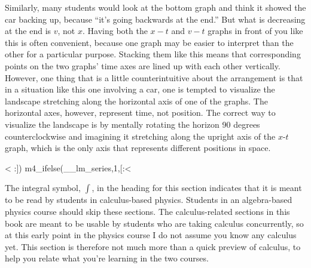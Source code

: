 Similarly, many students would look at the bottom graph and
think it showed the car backing up, because ``it's going
backwards at the end.''  But what is decreasing at the end
is $v$, not $x$. Having both the $x-t$ and $v-t$ graphs in
front of you like this is often convenient, because one
graph may be easier to interpret than the other for a
particular purpose.  Stacking them like this means that
corresponding points on the two graphs' time axes are lined
up with each other vertically.  However, one thing that is a
little counterintuitive about the arrangement is that in a
situation like this one involving a car, one is tempted to
visualize the landscape stretching along the horizontal axis
of one of the graphs.  The horizontal axes, however,
represent time, not position.  The correct way to visualize
the landscape is by mentally rotating the horizon 90 degrees
counterclockwise and imagining it stretching along the
upright axis of the $x$-$t$ graph, which is the only axis that
represents different positions in space.

<%
:])%
m4_ifelse(__lm_series,1,[:<%

The integral symbol, $\int$, in the heading for this
section indicates that it is meant to be read by students in
calculus-based physics. Students in an algebra-based physics
course should skip these sections. The calculus-related
sections in this book are meant to be usable by students who
are taking calculus concurrently, so at this early point in
the physics course I do not assume you know any calculus
yet. This section is therefore not much more than a quick
preview of calculus, to help you relate what you're
learning in the two courses.


